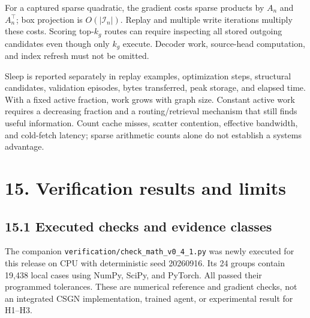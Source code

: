 \documentclass[
  11pt,
  a4paper,
]{article}
\begin{document}
For a captured sparse quadratic, the gradient costs sparse products by
\(A_n\) and \(A_n^\top\); box projection is \(O(|\mathcal I_n|)\).
Replay and multiple write iterations multiply these costs. Scoring
top-\(k_g\) routes can require inspecting all stored outgoing candidates
even though only \(k_g\) execute. Decoder work, source-head computation,
and index refresh must not be omitted.

Sleep is reported separately in replay examples, optimization steps,
structural candidates, validation episodes, bytes transferred, peak
storage, and elapsed time. With a fixed active fraction, work grows with
graph size. Constant active work requires a decreasing fraction and a
routing/retrieval mechanism that still finds useful information. Count
cache misses, scatter contention, effective bandwidth, and cold-fetch
latency; sparse arithmetic counts alone do not establish a systems
advantage.

\section{15. Verification results and
limits}\label{verification-results-and-limits}

\subsection{15.1 Executed checks and evidence
classes}\label{executed-checks-and-evidence-classes}

The companion \nolinkurl{verification/check_math_v0_4_1.py} was newly
executed for this release on CPU with deterministic seed 20260916. Its
24 groups contain 19,438 local cases using NumPy, SciPy, and PyTorch.
All passed their programmed tolerances. These are numerical reference
and gradient checks, not an integrated CSGN implementation, trained
agent, or experimental result for H1--H3.
\end{document}
